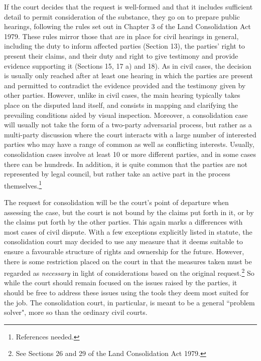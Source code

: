 If the court decides that the request is well-formed and that it includes sufficient detail to permit consideration of the substance, they go on to prepare public hearings, following the rules set out in Chapter 3 of the Land Consolidation Act 1979. These rules mirror those that are in place for civil hearings in general, including the duty to inform affected parties (Section 13), the parties' right to present their claims, and their duty and right to give testimony and provide evidence supporting it (Sections 15, 17 a) and 18). As in civil cases, the decision is usually only reached after at least one hearing in which the parties are present and permitted to contradict the evidence provided and the testimony given by other parties. However, unlike in civil cases, the main hearing typically takes place on the disputed land itself, and consists in mapping and clarifying the prevailing conditions aided by visual inspection. Moreover, a consolidation case will usually not take the form of a two-party adversarial process, but rather as a multi-party discussion where the court interacts with a large number of interested parties who may have a range of common as well as conflicting interests. Usually, consolidation cases involve at least 10 or more different parties, and in some cases there can be hundreds. In addition, it is quite common that the parties are not represented by legal council, but rather take an active part in the process themselves.\footnote{References needed.}

The request for consolidation will be the court's point of departure when assessing the case, but the court is not bound by the claims put forth in it, or by the claims put forth by the other parties. This again marks a differences with most cases of civil dispute. With a few exceptions explicitly listed in statute, the consolidation court may decided to use any measure that it deems suitable to ensure a favourable structure of rights and ownership for the future. However, there is some restriction placed on the court in that the measures taken must be regarded as \emph{necessary} in light of considerations based on the original request.\footnote{See Sections 26 and 29 of the Land Consolidation Act 1979.} So while the court should remain focused on the issues raised by the parties, it should be free to address these issues using the tools they deem most suited for the job. The consolidation court, in particular, is meant to be a general ``problem solver", more so than the ordinary civil courts.

